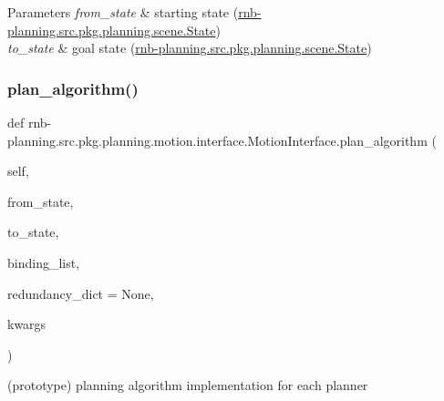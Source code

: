 \begin{DoxyParams}{Parameters}
{\em from\+\_\+state} & starting state (\hyperlink{classrnb-planning_1_1src_1_1pkg_1_1planning_1_1scene_1_1_state}{rnb-\/planning.\+src.\+pkg.\+planning.\+scene.\+State}) \\
\hline
{\em to\+\_\+state} & goal state (\hyperlink{classrnb-planning_1_1src_1_1pkg_1_1planning_1_1scene_1_1_state}{rnb-\/planning.\+src.\+pkg.\+planning.\+scene.\+State}) \\
\hline
\end{DoxyParams}
\mbox{\label{classrnb-planning_1_1src_1_1pkg_1_1planning_1_1motion_1_1interface_1_1_motion_interface_a1ebb6f845f97355c2e42001b8f23c1e7}} 
\subsubsection{\texorpdfstring{plan\+\_\+algorithm()}{plan\_algorithm()}}
{\footnotesize\ttfamily def rnb-\/planning.\+src.\+pkg.\+planning.\+motion.\+interface.\+Motion\+Interface.\+plan\+\_\+algorithm (\begin{DoxyParamCaption}\item[{}]{self,  }\item[{}]{from\+\_\+state,  }\item[{}]{to\+\_\+state,  }\item[{}]{binding\+\_\+list,  }\item[{}]{redundancy\+\_\+dict = {\ttfamily None},  }\item[{}]{kwargs }\end{DoxyParamCaption})}



(prototype) planning algorithm implementation for each planner 


